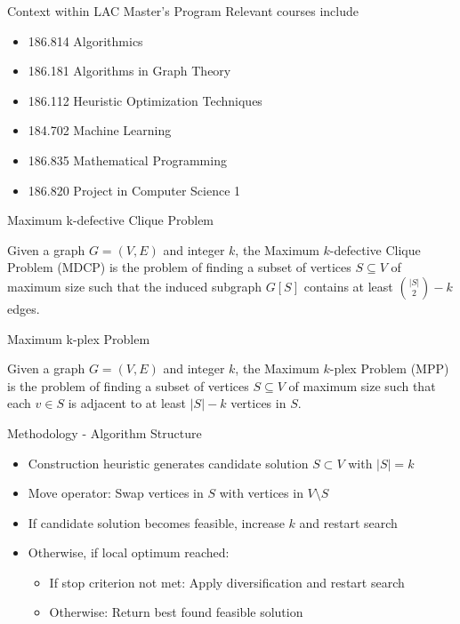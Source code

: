 \documentclass{beamer}
\newcommand{\backupbegin}{
   \newcounter{finalframe}
   \setcounter{finalframe}{\value{framenumber}}
}
\newcommand{\backupend}{
   \setcounter{framenumber}{\value{finalframe}}
}
\begin{document}
\begin{frame}{Context within LAC Master's Program}
Relevant courses include
\begin{itemize}
	\item 186.814 Algorithmics
	\item 186.181 Algorithms in Graph Theory
	\item 186.112 Heuristic Optimization Techniques
	\item 184.702 Machine Learning
	\item 186.835 Mathematical Programming
	\item 186.820 Project in Computer Science 1
\end{itemize} 
\end{frame}

\backupbegin

 


\begin{frame}{Maximum k-defective Clique Problem}
    \begin{definition}
	\label{def:mdcp}
	Given a graph $G = (V,E)$ and integer $k$, the Maximum $k$-defective Clique Problem (MDCP) is the problem of finding a subset of vertices $S \subseteq V$ of maximum size 
	such that the induced subgraph $G[S]$ contains at least $\binom{|S|}{2} - k$ edges. 
\end{definition}
\end{frame}

\begin{frame}{Maximum k-plex Problem}
    \begin{definition}
	\label{def:mpp}
	Given a graph $G = (V,E)$ and integer $k$, the Maximum $k$-plex Problem (MPP) is the problem of finding a subset of vertices $S \subseteq V$ of maximum size 
	such that each $v \in S$ is adjacent to at least $|S| - k$ vertices in $S$. 
\end{definition}
\end{frame}

\begin{frame}{Methodology - Algorithm Structure}
    \begin{itemize}
        \item<1-> Construction heuristic generates candidate solution $S \subset V$ with $|S| = k$
        \item<2-> Move operator: Swap vertices in $S$ with vertices in $V \setminus S$
        \item<3-> If candidate solution becomes feasible, increase $k$ and restart search
        \item<4-> Otherwise, if local optimum reached:
        \begin{itemize}
            \item If stop criterion not met: Apply diversification and restart search
            \item Otherwise: Return best found feasible solution
        \end{itemize}
    \end{itemize}
\end{frame}

\backupend
\end{document}
